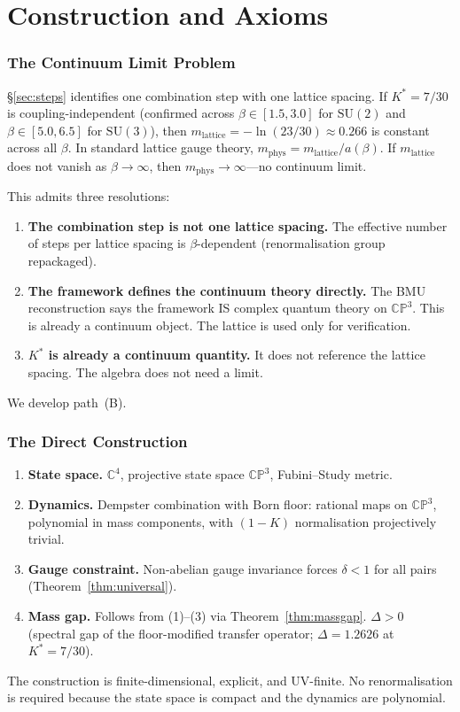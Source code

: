 \documentclass[11pt,a4paper]{article}
\theoremstyle{definition}
\theoremstyle{remark}
\newcommand{\CP}{\mathbb{CP}}
\newcommand{\C}{\mathbb{C}}
\newcommand{\SU}{\mathrm{SU}}
\begin{document}
\part{Construction and Axioms}\label{part:D}

\section{The Continuum Limit Problem}\label{sec:continuum}

\S\ref{sec:steps} identifies one combination step with one lattice spacing. If $K^*=7/30$ is coupling-independent (confirmed across $\beta\in[1.5,3.0]$ for $\SU(2)$ and $\beta\in[5.0,6.5]$ for $\SU(3)$), then $m_{\mathrm{lattice}}=-\ln(23/30)\approx 0.266$ is constant across all $\beta$. In standard lattice gauge theory, $m_{\mathrm{phys}}=m_{\mathrm{lattice}}/a(\beta)$. If $m_{\mathrm{lattice}}$ does not vanish as $\beta\to\infty$, then $m_{\mathrm{phys}}\to\infty$---no continuum limit.

This admits three resolutions:
\begin{enumerate}
\item[(A)] \textbf{The combination step is not one lattice spacing.} The effective number of steps per lattice spacing is $\beta$-dependent (renormalisation group repackaged).
\item[(B)] \textbf{The framework defines the continuum theory directly.} The BMU reconstruction says the framework IS complex quantum theory on $\CP^3$. This is already a continuum object. The lattice is used only for verification.
\item[(C)] \textbf{$K^*$ is already a continuum quantity.} It does not reference the lattice spacing. The algebra does not need a limit.
\end{enumerate}
We develop path~(B).


\section{The Direct Construction}\label{sec:direct}

\begin{enumerate}[nosep]
\item \textbf{State space.} $\C^4$, projective state space $\CP^3$, Fubini--Study metric.
\item \textbf{Dynamics.} Dempster combination with Born floor: rational maps on $\CP^3$, polynomial in mass components, with $(1-K)$ normalisation projectively trivial.
\item \textbf{Gauge constraint.} Non-abelian gauge invariance forces $\delta<1$ for all pairs (Theorem~\ref{thm:universal}).
\item \textbf{Mass gap.} Follows from (1)--(3) via Theorem~\ref{thm:massgap}. $\Delta>0$ (spectral gap of the floor-modified transfer operator; $\Delta=1.2626$ at $K^*=7/30$).
\end{enumerate}
The construction is finite-dimensional, explicit, and UV-finite. No renormalisation is required because the state space is compact and the dynamics are polynomial.
\end{document}
